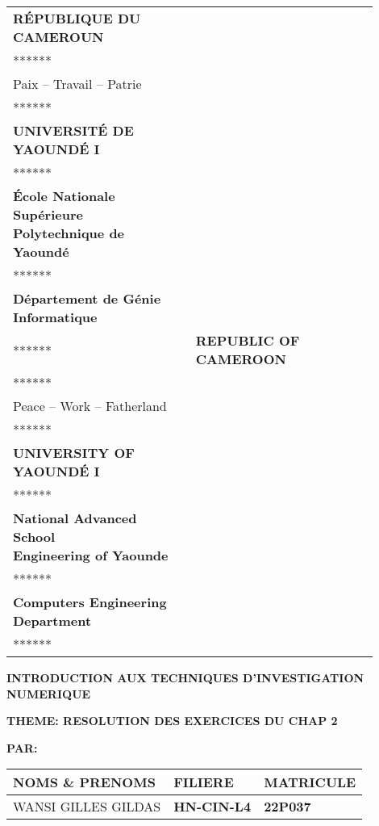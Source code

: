 \documentclass[12pt,a4paper]{article}
\begin{document}
\begin{titlepage}
    \centering

\begin{tabular}{p{0.45\linewidth} p{0.45\linewidth}}
\centering
\textbf{RÉPUBLIQUE DU CAMEROUN}\\
******\\
Paix -- Travail -- Patrie\\
******\\
\textbf{UNIVERSITÉ DE YAOUNDÉ I}\\
******\\
\textbf {École Nationale Supérieure\\
Polytechnique de Yaoundé}\\
******\\
\textbf {Département de Génie Informatique}\\
****** &
\centering
\textbf{REPUBLIC OF CAMEROON}\\
******\\
Peace -- Work -- Fatherland\\
******\\
\textbf{UNIVERSITY OF YAOUNDÉ I}\\
******\\
\textbf {National Advanced School\\
Engineering of Yaounde}\\
******\\
\textbf {Computers Engineering Department}\\
****** \\
\end{tabular}
\vspace{2cm}

    \begin{LARGE}

    \textbf{INTRODUCTION AUX TECHNIQUES D'INVESTIGATION NUMERIQUE}
    \end{LARGE}

    \vspace{2cm}

    \begin{Large}
    \textbf{THEME: RESOLUTION DES EXERCICES DU CHAP 2}
    \end{Large}
    
    \vspace{5cm}
	
	
	
	\begin{flushleft}
	\textbf{PAR:}
	\end{flushleft}
    \begin{tabular}{|>{\centering\arraybackslash}p{7cm}|>{\centering\arraybackslash}p{4cm}|>{\centering\arraybackslash}p{3cm}|}
        \hline
        \textbf{NOMS \& PRENOMS} & \textbf{FILIERE  } & \textbf{MATRICULE} \\
        \hline
        WANSI GILLES GILDAS & \textbf{HN-CIN-L4} & \textbf{22P037} \\
        \hline
    \end{tabular}


\end{titlepage}
\end{document}

